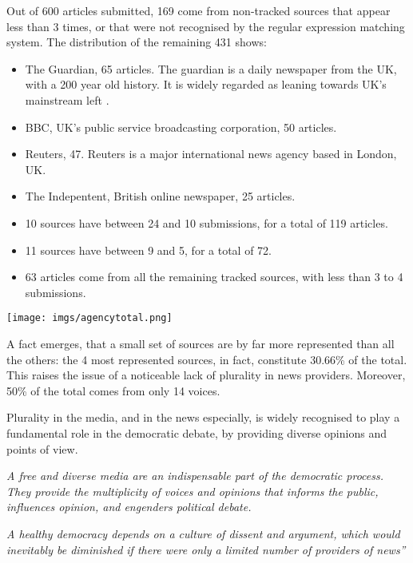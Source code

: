 \documentclass{article}
\begin{document}
Out of 600 articles submitted, 169 come from non-tracked sources that appear less than 3 times, or that were not recognised by the regular expression matching system. The distribution of the remaining 431 shows:

\begin{itemize}
\item The Guardian, 65 articles. The guardian is a daily newspaper from the UK, with a 200 year old history. It is widely regarded as leaning towards UK's mainstream left \cite{ipsosmorivoting}.
\item BBC, UK's public service broadcasting corporation, 50 articles.
\item Reuters, 47. Reuters is a major international news agency based in London, UK.
\item The Indepentent, British online newspaper, 25 articles.
\item 10 sources have between 24 and 10 submissions, for a total of 119 articles.
\item 11 sources have between 9 and 5, for a total of 72.
\item 63 articles come from all the remaining tracked sources, with less than 3 to 4 submissions.
\end{itemize}

\bigskip

\texttt{[image: imgs/agencytotal.png]}

\bigskip

A fact emerges, that a small set of sources are by far more represented than all the others: the 4 most represented sources, in fact, constitute 30.66\% of the total. This raises the issue of a noticeable lack of plurality in news providers. Moreover, 50\% of the total comes from only 14 voices.

Plurality in the media, and in the news especially, is widely recognised to play a fundamental role in the democratic debate\cite{reutersnewsplurality}, by providing diverse opinions and points of view.

\begin{center}
\textit{A free and diverse media are an indispensable part of the democratic process. They provide the multiplicity of voices and opinions that informs the public,
influences opinion, and engenders political debate.\cite{houseoflordsownershipnews}}
\end{center}
\smallskip
\begin{center}
\textit{A healthy democracy depends on a culture of dissent and argument, which would inevitably\linebreak 
be diminished if there were only a limited number of providers of news”}
\end{center}
\end{document}
